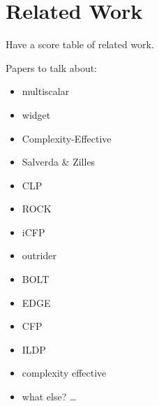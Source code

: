 \section{Related Work}
\label{sec:rel_work}

Have a score table of related work.

Papers to talk about:

\begin{itemize}
    \item multiscalar
    \item widget
    \item Complexity-Effective
    \item Salverda \& Zilles
    \item CLP
    \item ROCK
    \item iCFP
    \item outrider
    \item BOLT
    \item EDGE
    \item CFP
    \item ILDP
    \item complexity effective
    \item what else?
    \ldots
\end{itemize}
